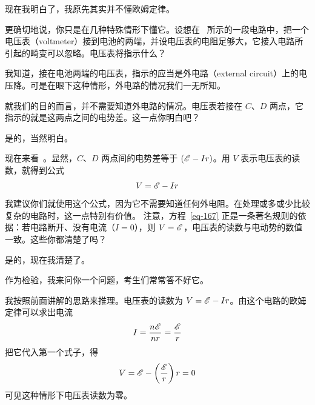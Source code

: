 \begin{dialogue}
\stda 现在我明白了，我原先其实并不懂欧姆定律。

\tchr 更确切地说，你只是在几种特殊情形下懂它。设想在~ 所示的一段电路中，把一个电压表（voltmeter）接到电池的两端，并设电压表的电阻足够大，它接入电路所引起的畸变可以忽略。电压表将指示什么？

\stda 我知道，接在电池两端的电压表，指示的应当是外电路（external circuit）上的电压降。可是在眼下这种情形，外电路的情况我们一无所知。

\tchr 就我们的目的而言，并不需要知道外电路的情况。电压表若接在 $C$、$D$ 两点，它指示的就是这两点之间的电势差。这一点你明白吧？

\stda 是的，当然明白。

\tchr 现在来看~。显然，$C$、$D$ 两点间的电势差等于 $(\mathcal{E} - Ir)$。用 $V$ 表示电压表的读数，就得到公式
\begin{equation}%
V = \Ea - Ir
\label{eq-167}
\end{equation}
我建议你们就使用这个公式，因为它不需要知道任何外电阻。在处理或多或少比较复杂的电路时，这一点特别有价值。
注意，方程~\eqref{eq-167} 正是一条著名规则的依据：若电路断开、没有电流（$I = 0$），则 $V =\mathcal{E}$，电压表的读数与电动势的数值一致。这些你都清楚了吗？

\stda 是的，现在我清楚了。

\tchr 作为检验，我来问你一个问题，考生们常常答不好它。

\stda 我按照前面讲解的思路来推理。电压表的读数为 $V = \mathcal{E} -Ir$。由这个电路的欧姆定律可以求出电流
\begin{equation*}
I = \frac{n\mathcal{E}}{nr} = \frac{\mathcal{E}}{r}
\end{equation*}
把它代入第一个式子，得
\begin{equation*}
V = \mathcal{E} - \left( \frac{\mathcal{E}}{r} \right)r = 0
\end{equation*}
可见这种情形下电压表读数为零。


\end{dialogue}

